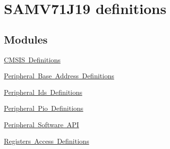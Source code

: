 \hypertarget{group__SAMV71J19__definitions}{}\section{S\+A\+M\+V71\+J19 definitions}
\label{group__SAMV71J19__definitions}
\subsection*{Modules}
\begin{DoxyCompactItemize}
\item 
\mbox{\hyperlink{group__SAMV71J19__cmsis}{C\+M\+S\+I\+S Definitions}}
\item 
\mbox{\hyperlink{group__SAMV71J19__base}{Peripheral Base Address Definitions}}
\item 
\mbox{\hyperlink{group__SAMV71J19__id}{Peripheral Ids Definitions}}
\item 
\mbox{\hyperlink{group__SAMV71J19__pio}{Peripheral Pio Definitions}}
\item 
\mbox{\hyperlink{group__SAMV71J19__api}{Peripheral Software A\+PI}}
\item 
\mbox{\hyperlink{group__SAMV71J19__reg}{Registers Access Definitions}}
\end{DoxyCompactItemize}
